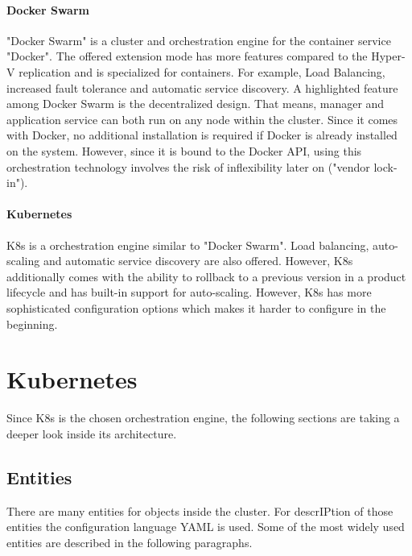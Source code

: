 \paragraph{Docker Swarm}
"Docker Swarm" is a cluster and orchestration engine for the container service "Docker". The offered extension mode has more features compared to the Hyper-V replication and is specialized for containers. For example, Load Balancing, increased fault tolerance and automatic service discovery.
A highlighted feature among Docker Swarm is the decentralized design. That means, manager and application service can both run on any node within the cluster. Since it comes with Docker, no additional installation is required if Docker is already installed on the system.
However, since it is bound to the Docker API, using this orchestration technology involves the risk of inflexibility later on ("vendor lock-in").

 
\paragraph{Kubernetes}
\acf{K8s} is a orchestration engine similar to "Docker Swarm". Load balancing, auto-scaling and automatic service discovery are also offered. However, \ac{K8s} additionally comes with the ability to rollback to a previous version in a product lifecycle and has built-in support for auto-scaling.
However, \ac{K8s} has more sophisticated configuration options which makes it harder to configure in the beginning.

\section{Kubernetes}
Since \ac{K8s} is the chosen orchestration engine, the following sections are taking a deeper look inside its architecture.

\subsection{Entities}
There are many entities for objects inside the cluster. For descr\ac{IP}tion of those entities the configuration language YAML is used. Some of the most widely used entities are described in the following paragraphs.
